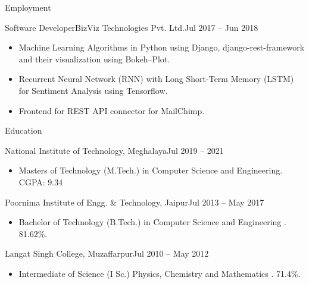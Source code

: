 \documentclass[]{shivshakti}
\begin{document}
	\makeheader
	
	\begin{cvsection}{Employment}
		\begin{cvsubsection}{Software Developer}{BizViz Technologies Pvt. Ltd.}{Jul 2017 -- Jun 2018}	
			\begin{itemize}
				\item Machine Learning Algorithms in Python using Django, django-rest-framework and their visualization using Bokeh--Plot.
				\item Recurrent Neural Network (RNN) with Long Short-Term Memory (LSTM) for Sentiment Analysis using Tensorflow.
				\item Frontend for REST API connector for MailChimp.
			\end{itemize}
		\end{cvsubsection}

	\end{cvsection}
	
	\begin{cvsection}{Education}
		\begin{newcvsubsection}{National Institute of Technology, Meghalaya}{Jul 2019 -- 2021}
			\begin{itemize}
				\item
				Masters of Technology (M.Tech.) in Computer Science and Engineering. CGPA: 9.34
			\end{itemize}
		\end{newcvsubsection}
		
		\begin{newcvsubsection}{Poornima Institute of Engg. \& Technology, Jaipur}{Jul 2013 -- May 2017}
		    \begin{itemize}
		        \item Bachelor of Technology (B.Tech.) in Computer Science and Engineering . 81.62\%.
		    \end{itemize}
		\end{newcvsubsection}
		\begin{newcvsubsection}{Langat Singh College, Muzaffarpur}{Jul 2010 -- May 2012}
		    \begin{itemize}
		        \item Intermediate of Science (I Sc.) Physics, Chemistry and Mathematics . 71.4\%.
		    \end{itemize}
		\end{newcvsubsection}
	\end{cvsection}
	
\end{document}
